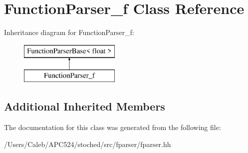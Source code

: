 \hypertarget{class_function_parser__f}{}\section{Function\+Parser\+\_\+f Class Reference}
\label{class_function_parser__f}
Inheritance diagram for Function\+Parser\+\_\+f\+:\begin{figure}[H]
\begin{center}
\leavevmode
\includegraphics[height=2.000000cm]{class_function_parser__f}
\end{center}
\end{figure}
\subsection*{Additional Inherited Members}


The documentation for this class was generated from the following file\+:\begin{DoxyCompactItemize}
\item 
/\+Users/\+Caleb/\+A\+P\+C524/stoched/src/fparser/fparser.\+hh\end{DoxyCompactItemize}
